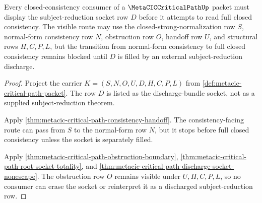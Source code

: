 \begin{theorem}
\label{thm:metacic-critical-path-subject-reduction-socket-budget}
Every closed-consistency consumer of a $\MetaCICCriticalPathUp$ packet must display the subject-reduction socket row $D$ before it attempts to read full closed consistency. The visible route may use the closed-strong-normalization row $S$, normal-form consistency row $N$, obstruction row $O$, handoff row $U$, and structural rows $H,C,P,L$, but the transition from normal-form consistency to full closed consistency remains blocked until $D$ is filled by an external subject-reduction discharge.
\end{theorem}
\begin{proof}
Project the carrier $K=(S,N,O,U,D,H,C,P,L)$ from \autoref{def:metacic-critical-path-packet}. The row $D$ is listed as the discharge-bundle socket, not as a supplied subject-reduction theorem.

Apply \autoref{thm:metacic-critical-path-consistency-handoff}. The consistency-facing route can pass from $S$ to the normal-form row $N$, but it stops before full closed consistency unless the socket is separately filled.

Apply \autoref{thm:metacic-critical-path-obstruction-boundary}, \autoref{thm:metacic-critical-path-root-socket-totality}, and \autoref{thm:metacic-critical-path-discharge-socket-nonescape}. The obstruction row $O$ remains visible under $U,H,C,P,L$, so no consumer can erase the socket or reinterpret it as a discharged subject-reduction row.
\end{proof}

